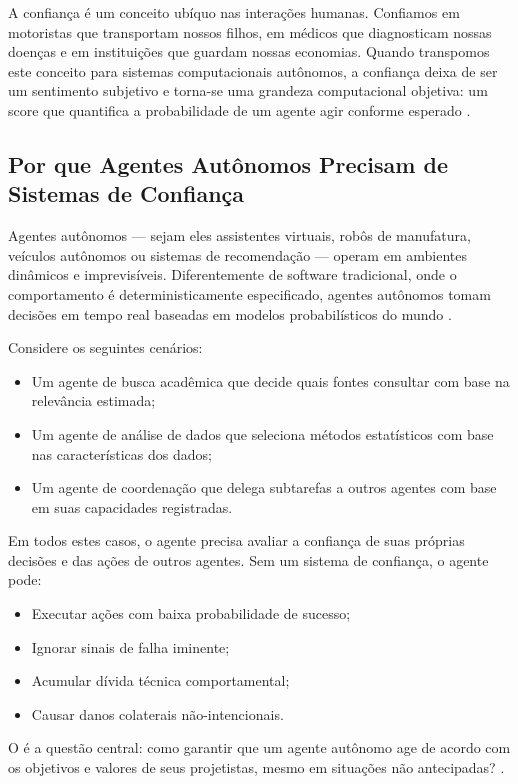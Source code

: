 A confiança é um conceito ubíquo nas interações humanas. Confiamos em
motoristas que transportam nossos filhos, em médicos que diagnosticam
nossas doenças e em instituições que guardam nossas economias. Quando
transpomos este conceito para sistemas computacionais autônomos, a
confiança deixa de ser um sentimento subjetivo e torna-se uma grandeza
computacional objetiva: um score que quantifica a probabilidade de um
agente agir conforme esperado \cite{russell2020inteligencia, wooldridge2009multiagent}.

\subsection{Por que Agentes Autônomos Precisam de Sistemas de Confiança}

Agentes autônomos — sejam eles assistentes virtuais, robôs de
manufatura, veículos autônomos ou sistemas de recomendação — operam em
ambientes dinâmicos e imprevisíveis. Diferentemente de software
tradicional, onde o comportamento é deterministicamente especificado,
agentes autônomos tomam decisões em tempo real baseadas em modelos
probabilísticos do mundo \cite{russell2020inteligencia, xi2023rise}.

Considere os seguintes cenários:
\begin{itemize}
\item Um agente de busca acadêmica que decide quais fontes consultar
com base na relevância estimada;
\item Um agente de análise de dados que seleciona métodos estatísticos
com base nas características dos dados;
\item Um agente de coordenação que delega subtarefas a outros agentes
com base em suas capacidades registradas.
\end{itemize}

Em todos estes casos, o agente precisa avaliar a confiança de suas
próprias decisões e das ações de outros agentes. Sem um sistema de
confiança, o agente pode:
\begin{itemize}
\item Executar ações com baixa probabilidade de sucesso;
\item Ignorar sinais de falha iminente;
\item Acumular dívida técnica comportamental;
\item Causar danos colaterais não-intencionais.
\end{itemize}

O  é a questão central: como
garantir que um agente autônomo age de acordo com os objetivos e
valores de seus projetistas, mesmo em situações não antecipadas?
\cite{russell2020inteligencia, cristiano2017deep}.

